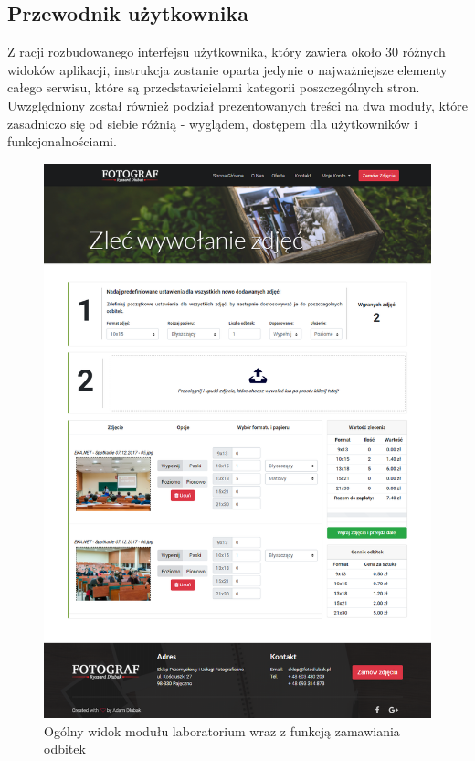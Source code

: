 \vspace*{0.01\baselineskip}

\subsection{Przewodnik użytkownika}
\quad Z racji rozbudowanego interfejsu użytkownika, który zawiera około 30 różnych widoków aplikacji, instrukcja zostanie oparta jedynie o najważniejsze elementy całego serwisu, które są przedstawicielami kategorii poszczególnych stron. Uwzględniony został również podział prezentowanych treści na dwa moduły, które zasadniczo się od siebie różnią - wyglądem, dostępem dla użytkowników i funkcjonalnościami.

\begin{figure}[ht]
	\centering
	\includegraphics[width=0.85\linewidth]{graphics/chapter-4/screen-1.png}
	\caption{Ogólny widok modułu laboratorium wraz z funkcją zamawiania odbitek}
	\label{fig:screen-1}
\end{figure}
\newpage

\vspace*{0.01\baselineskip}



